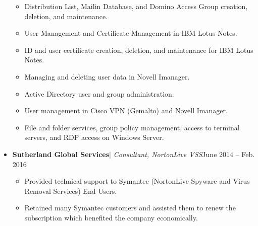 \documentclass[letterpaper, 12pt]{article}
\begin{document}
\begin{minipage}[t]{1\textwidth}
\begin{itemize}[noitemsep]
			\vspace*{-0.6cm}
			\begin{itemize}[noitemsep]
				\item{Distribution List, Mailin Database, and Domino Access Group creation, deletion, and maintenance.}
				\item {User Management and Certificate Management in IBM Lotus Notes.}
				\item {ID and user certificate creation, deletion, and maintenance for IBM Lotus Notes.}
				\item {Managing and deleting user data in Novell Imanager.}
				\item {Active Directory user and group administration.}
				\item {User management in Cisco VPN (Gemalto) and Novell Imanager.}
				\item {File and folder services, group policy management, access to terminal servers, and RDP access on Windows Server.}	
			\end{itemize}
			\vspace*{-0.1cm}
			\item {\textbf{Sutherland Global Services}$|$ \textit{Consultant, NortonLive VSS}\hfill{June 2014 -- Feb. 2016}}\\
			\vspace*{-0.6cm}
			\begin{itemize}[noitemsep]
				\item {Provided technical support to Symantec (NortonLive Spyware and Virus Removal Services) End Users.}
				\item {Retained many Symantec customers and assisted them to renew the subscription which benefited the company economically.}
				
			\end{itemize}
		\end{itemize}
	\end{minipage}	
		
		
\end{document}
